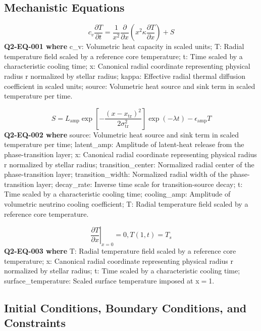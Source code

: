 \documentclass[11pt]{article}
\begin{document}
\subsection{Mechanistic Equations}

\begin{equation}\label{eq:Q2-EQ-001}
c_v \frac{\partial T}{\partial t} = \frac{1}{x^2}\frac{\partial}{\partial x}\left(x^2 \kappa \frac{\partial T}{\partial x}\right) + S
\end{equation}
\noindent\textbf{Q2-EQ-001 where} c\_v: Volumetric heat capacity in scaled units; T: Radial temperature field scaled by a reference core temperature; t: Time scaled by a characteristic cooling time; x: Canonical radial coordinate representing physical radius r normalized by stellar radius; kappa: Effective radial thermal diffusion coefficient in scaled units; source: Volumetric heat source and sink term in scaled temperature per time.

\begin{equation}\label{eq:Q2-EQ-002}
S = L_{\mathrm{amp}}\exp\left[-\frac{(x-x_{\mathrm{tr}})^2}{2\sigma_{\mathrm{tr}}^2}\right]\exp(-\lambda t) - \epsilon_{\mathrm{amp}} T
\end{equation}
\noindent\textbf{Q2-EQ-002 where} source: Volumetric heat source and sink term in scaled temperature per time; latent\_amp: Amplitude of latent-heat release from the phase-transition layer; x: Canonical radial coordinate representing physical radius r normalized by stellar radius; transition\_center: Normalized radial center of the phase-transition layer; transition\_width: Normalized radial width of the phase-transition layer; decay\_rate: Inverse time scale for transition-source decay; t: Time scaled by a characteristic cooling time; cooling\_amp: Amplitude of volumetric neutrino cooling coefficient; T: Radial temperature field scaled by a reference core temperature.

\begin{equation}\label{eq:Q2-EQ-003}
\left.\frac{\partial T}{\partial x}\right|_{x=0}=0,  T(1,t)=T_s
\end{equation}
\noindent\textbf{Q2-EQ-003 where} T: Radial temperature field scaled by a reference core temperature; x: Canonical radial coordinate representing physical radius r normalized by stellar radius; t: Time scaled by a characteristic cooling time; surface\_temperature: Scaled surface temperature imposed at x\ensuremath{=}1.

\subsection{Initial Conditions, Boundary Conditions, and Constraints}
\end{document}
